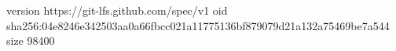 version https://git-lfs.github.com/spec/v1
oid sha256:04e8246e342503aa0a66fbcc021a11775136bf879079d21a132a75469be7a544
size 98400
